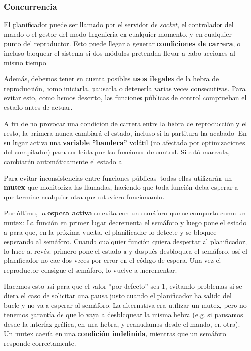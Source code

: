 \subsubsection{Concurrencia}

El planificador puede ser llamado por el servidor de \textit{socket}, el controlador del mando o el gestor del modo Ingeniería en cualquier momento, y en cualquier punto del reproductor. Esto puede llegar a generar \textbf{condiciones de carrera}, o incluso bloquear el sistema si dos módulos pretenden llevar a cabo acciones al mismo tiempo.

Además, debemos tener en cuenta posibles \textbf{usos ilegales} de la hebra de reproducción, como iniciarla, pausarla o detenerla varias veces consecutivas. Para evitar esto, como hemos descrito, las funciones públicas de control comprueban el estado antes de actuar.

A fin de no provocar una condición de carrera entre la hebra de reproducción y el resto, la primera nunca cambiará el estado, incluso si la partitura ha acabado. En su lugar activa una \textbf{variable ''bandera''} volátil (no afectada por optimizaciones del compilador) para ser leída por las funciones de control. Si está marcada, cambiarán automáticamente el estado a .

Para evitar inconsistencias entre funciones públicas, todas ellas utilizarán un \textbf{\acrshort{mutex}} que monitoriza las llamadas, haciendo que toda función deba esperar a que termine cualquier otra que estuviera funcionando.

Por último, la \textbf{espera activa} se evita con un semáforo que se comporta como un \acrshort{mutex}: La función  en primer lugar decrementa el semáforo y luego pone el estado a  para que, en la próxima vuelta, el planificador lo detecte y se bloquee esperando al semáforo. Cuando cualquier función quiera despertar al planificador, lo hace al revés: primero pone el estado a  y después desbloquea el semáforo, así el planificador no cae dos veces por error en el código de espera. Una vez el reproductor consigue el semáforo, lo vuelve a incrementar. 

Hacemos esto así para que el valor ''por defecto'' sea 1, evitando problemas si se diera el caso de solicitar una pausa justo cuando el planificador ha salido del bucle y no va a esperar al semáforo. La alternativa era utilizar un \acrshort{mutex}, pero no tenemos garantía de que lo vaya a desbloquear la misma hebra (e.g. si pausamos desde la interfaz gráfica, en una hebra, y reanudamos desde el mando, en otra). Un \acrshort{mutex} caería en una \textbf{condición indefinida}, mientras que un semáforo responde correctamente.

